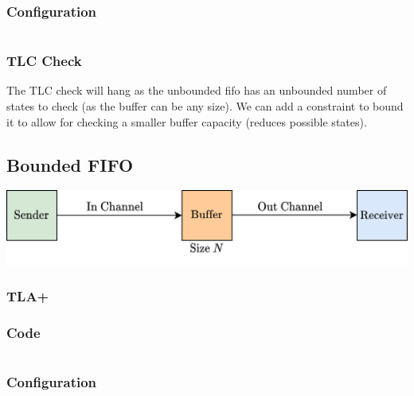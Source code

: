 \subsubsection{Configuration}
\inputminted{text}{tla_plus/code/UnboundedFIFO.cfg}
\subsubsection{TLC Check}
The TLC check will hang as the unbounded fifo has an unbounded number of states to check (as the buffer can be any size). We can add a constraint to bound it to allow for checking a smaller buffer capacity (reduces possible states).

\subsection{Bounded FIFO}
\begin{center}
    \includegraphics[width=.5\textwidth]{tla_plus/images/bounded_FIFO.drawio.png}
\end{center}
\subsubsection{TLA+}

\subsubsection{Code}
\inputminted{text}{tla_plus/code/BoundedFIFO.tla}
\subsubsection{Configuration}
\inputminted{text}{tla_plus/code/BoundedFIFO.cfg}
